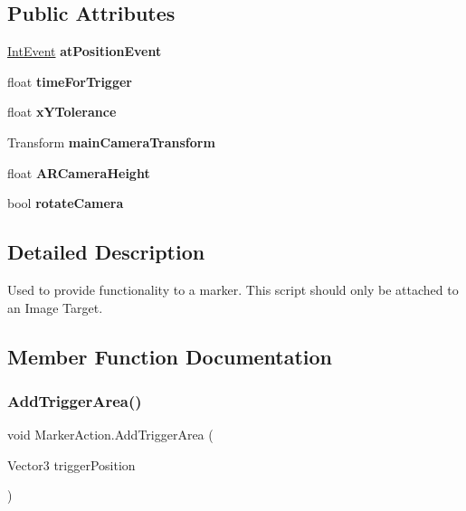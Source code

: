 \subsection*{Public Attributes}
\begin{DoxyCompactItemize}
\item 
\mbox{\label{class_marker_action_ab06b954c640d0e6db4dd30c85d03de0a}} 
\mbox{\hyperlink{class_int_event}{Int\+Event}} {\bfseries at\+Position\+Event}
\item 
\mbox{\label{class_marker_action_ab6478658ec4034e2d3187f523f2e765c}} 
float {\bfseries time\+For\+Trigger}
\item 
\mbox{\label{class_marker_action_a0cb3a870d312e9a7fbb3499d3ee144c7}} 
float {\bfseries x\+Y\+Tolerance}
\item 
\mbox{\label{class_marker_action_a2211829235e941c857a3b5307226ff23}} 
Transform {\bfseries main\+Camera\+Transform}
\item 
\mbox{\label{class_marker_action_a2660414d0939bac7e1da2dcb5b7d54bf}} 
float {\bfseries A\+R\+Camera\+Height}
\item 
\mbox{\label{class_marker_action_a466823d974af6c6beee73a740fb2a9c2}} 
bool {\bfseries rotate\+Camera}
\end{DoxyCompactItemize}


\subsection{Detailed Description}
Used to provide functionality to a marker. This script should only be attached to an Image Target. 



\subsection{Member Function Documentation}
\mbox{\label{class_marker_action_a61235131a5158547a0ae7ddab7ef8c02}} 
\subsubsection{\texorpdfstring{AddTriggerArea()}{AddTriggerArea()}\hspace{0.1cm}{\footnotesize\ttfamily [1/2]}}
{\footnotesize\ttfamily void Marker\+Action.\+Add\+Trigger\+Area (\begin{DoxyParamCaption}\item[{Vector3}]{trigger\+Position }\end{DoxyParamCaption})}



